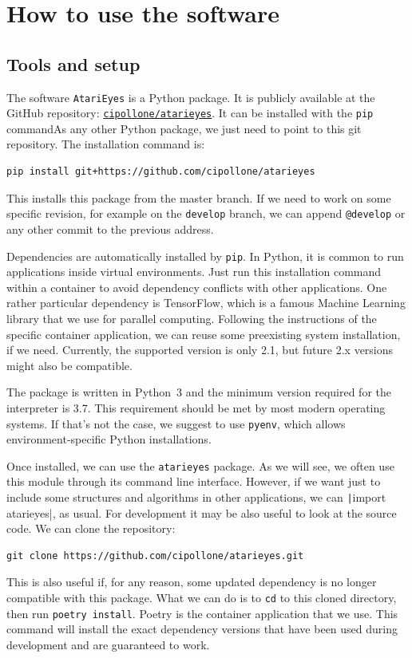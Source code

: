 \section{How to use the software}

\label{sec:how-to-use}

\subsection{Tools and setup}

The software \texttt{AtariEyes} is a Python package. It is publicly available
at the GitHub repository:
\href{https://github.com/cipollone/atarieyes}{\texttt{cipollone/atarieyes}}.
It can be installed with the \texttt{pip} commandAs any other Python package,
we just need to point to this git repository. The installation
command is:
\begin{verbatim}
pip install git+https://github.com/cipollone/atarieyes
\end{verbatim}
This installs this package from the master branch. If we need to work on some
specific revision, for example on the \texttt{develop} branch, we can append
\verb!@develop! or any other commit to the previous address.

Dependencies are automatically installed by \texttt{pip}.  In Python, it is
common to run applications inside virtual environments. Just run this
installation command within a container to avoid dependency conflicts with
other applications. One rather particular dependency is TensorFlow, which is a
famous Machine Learning library that we use for parallel computing. Following
the instructions of the specific container application, we can reuse some
preexisting system installation, if we need. Currently, the supported version
is only 2.1, but future 2.x versions might also be compatible.

The package is written in Python~3 and the minimum version required for the
interpreter is 3.7. This requirement should be met by most modern operating
systems. If that's not the case, we suggest to use \texttt{pyenv}, which
allows environment-specific Python installations.

Once installed, we can use the \texttt{atarieyes} package. As we will see, we
often use this module through its command line interface. However, if we want
just to include some structures and algorithms in other applications, we can
\texttt|import atarieyes|, as usual. For development it may
be also useful to look at the source code. We can clone the repository:
\begin{verbatim}
git clone https://github.com/cipollone/atarieyes.git
\end{verbatim}
This is also useful if, for any reason, some updated dependency is no longer
compatible with this package. What we can do is to \texttt{cd} to this cloned
directory, then run \texttt{poetry install}. Poetry is the container
application that we use. This command will install the exact dependency
versions that have been used during development and are guaranteed to work.


